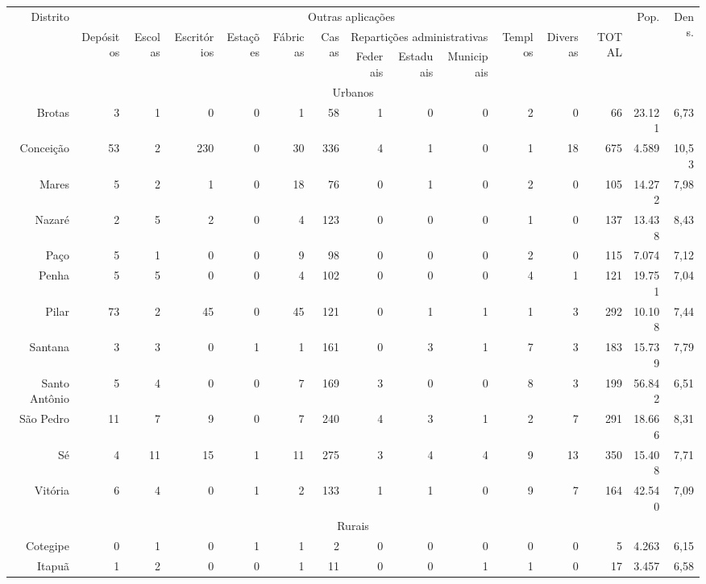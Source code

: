 \begin{landscape}
\begin{table}[!htp]
\centering
{}
{
\begin{tiny}
\begin{tabular}{rrrrrrrrrrrrrrr}
\hline
\multirow{3}{*}{Distrito} & \multicolumn{12}{c}{Outras aplicações} & \multirow{3}{*}{Pop.} & \multirow{3}{*}{Dens.} \\
\cline{2-13}
 & \multirow{2}{*}{Depósitos} & \multirow{2}{1cm}{Escolas} & \multirow{2}{*}{Escritórios} & \multirow{2}{*}{Estações} & \multirow{2}{*}{Fábricas} & \multirow{2}{*}{Casas} & \multicolumn{3}{c}{Repartições administrativas} & \multirow{2}{*}{Templos} & \multirow{2}{*}{Diversas} & \multirow{2}{*}{TOTAL} & & \\
\cline{8-10} & & & & & ou oficinas & de negócio & Federais & Estaduais & Municipais & & & & & \\
\hline
\multicolumn{15}{c}{Urbanos} \\
\hline
Brotas	&3	&1	&0	&0	&1	&58	&1	&0	&0	&2	&0	&66	&23.121	&6,73 \\
Conceição	&53	&2	&230	&0	&30	&336	&4	&1	&0	&1	&18	&675	&4.589	&10,53 \\
Mares	&5	&2	&1	&0	&18	&76	&0	&1	&0	&2	&0	&105	&14.272	&7,98 \\
Nazaré	&2	&5	&2	&0	&4	&123	&0	&0	&0	&1	&0	&137	&13.438	&8,43 \\
Paço	&5	&1	&0	&0	&9	&98	&0	&0	&0	&2	&0	&115	&7.074	&7,12 \\
Penha	&5	&5	&0	&0	&4	&102	&0	&0	&0	&4	&1	&121	&19.751	&7,04 \\
Pilar	&73	&2	&45	&0	&45	&121	&0	&1	&1	&1	&3	&292	&10.108	&7,44 \\
Santana	&3	&3	&0	&1	&1	&161	&0	&3	&1	&7	&3	&183	&15.739	&7,79 \\
Santo Antônio	&5	&4	&0	&0	&7	&169	&3	&0	&0	&8	&3	&199	&56.842	&6,51 \\
São Pedro	&11	&7	&9	&0	&7	&240	&4	&3	&1	&2	&7	&291	&18.666	&8,31 \\
Sé	&4	&11	&15	&1	&11	&275	&3	&4	&4	&9	&13	&350	&15.408	&7,71 \\
Vitória	&6	&4	&0	&1	&2	&133	&1	&1	&0	&9	&7	&164	&42.540	&7,09 \\
\hline
\multicolumn{15}{c}{Rurais} \\
\hline
Cotegipe	&0	&1	&0	&1	&1	&2	&0	&0	&0	&0	&0	&5	&4.263	&6,15 \\
Itapuã	&1	&2	&0	&0	&1	&11	&0	&0	&1	&1	&0	&17	&3.457	&6,58 \\

\end{tabular}
\end{tiny}}
\end{table}
\end{landscape}
